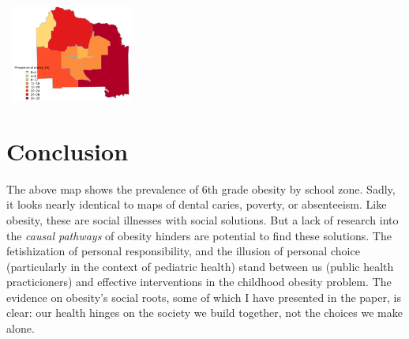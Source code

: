 \begin{multicols}{2}
\includegraphics[height=120, width=165]{alachua3.png}


\section*{Conclusion}
The above map shows the prevalence of 6th grade obesity by school zone.  Sadly, it looks nearly identical to maps of dental caries, poverty, or absenteeism.  Like obesity, these are social illnesses with social solutions. But a lack of research into the \emph{causal pathways} of obesity hinders are potential to find these solutions.  The fetishization of personal responsibility, and the illusion of personal choice (particularly in the context of pediatric health) stand between us (public health practicioners) and effective interventions in the childhood obesity problem.  The evidence on obesity's social roots, some of which I have presented in the paper, is clear: our health hinges on the society we build together, not the choices we make alone.




\newpage




\end{multicols}

